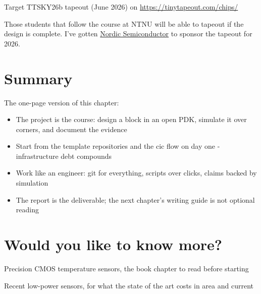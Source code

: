 Target TTSKY26b tapeout (June 2026) on
\url{https://tinytapeout.com/chips/}

Those students that follow the course at NTNU will be able to tapeout if
the design is complete. I've gotten \href{https://nordicsemi.com}{Nordic
Semiconductor} to sponsor the tapeout for 2026.

\section{Summary}\label{summary}

The one-page version of this chapter:

\begin{itemize}
\tightlist
\item
  The project is the course: design a block in an open PDK, simulate it
  over corners, and document the evidence
\item
  Start from the template repositories and the cic flow on day one -
  infrastructure debt compounds
\item
  Work like an engineer: git for everything, scripts over clicks, claims
  backed by simulation
\item
  The report is the deliverable; the next chapter's writing guide is not
  optional reading
\end{itemize}

\section{Would you like to know
more?}\label{would-you-like-to-know-more}

Precision CMOS temperature sensors, the book chapter to read before
starting 

Recent low-power sensors, for what the state of the art costs in area
and current 
 

